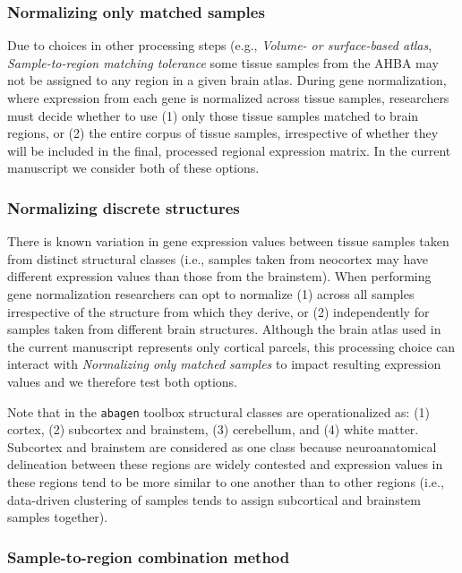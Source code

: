 \documentclass[12pt,aps,pra,reprint,showkeys]{revtex4-1}
\begin{document}
\subsubsection*{Normalizing only matched samples}

Due to choices in other processing steps (e.g., \emph{Volume- or surface-based atlas}, \emph{Sample-to-region matching tolerance} some tissue samples from the AHBA may not be assigned to any region in a given brain atlas.
During gene normalization, where expression from each gene is normalized across tissue samples, researchers must decide whether to use (1) only those tissue samples matched to brain regions, or (2) the entire corpus of tissue samples, irrespective of whether they will be included in the final, processed regional expression matrix.
In the current manuscript we consider both of these options.

\subsubsection*{Normalizing discrete structures}

There is known variation in gene expression values between tissue samples taken from distinct structural classes (i.e., samples taken from neocortex may have different expression values than those from the brainstem).
When performing gene normalization researchers can opt to normalize (1) across all samples irrespective of the structure from which they derive, or (2)  independently for samples taken from different brain structures.
Although the brain atlas used in the current manuscript represents only cortical parcels, this processing choice can interact with \emph{Normalizing only matched samples} to impact resulting expression values and we therefore test both options.

Note that in the \texttt{abagen} toolbox structural classes are operationalized as: (1) cortex, (2) subcortex and brainstem, (3) cerebellum, and (4) white matter.
Subcortex and brainstem are considered as one class because neuroanatomical delineation between these regions are widely contested and expression values in these regions tend to be more similar to one another than to other regions (i.e., data-driven clustering of samples tends to assign subcortical and brainstem samples together).

\subsubsection*{Sample-to-region combination method}
\end{document}
